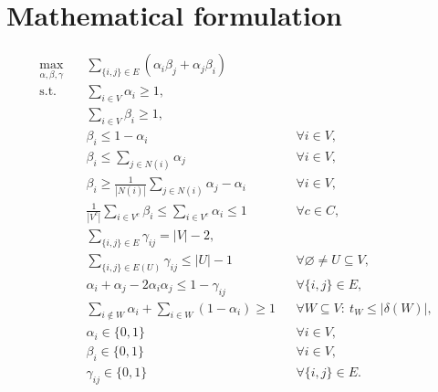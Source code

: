 \documentclass{article}
\begin{document}
\section*{Mathematical formulation}
\begin{align}
\max_{\alpha,\beta,\gamma}\quad
&\sum_{\{i,j\}\in E}\left(\alpha_i\beta_j+\alpha_j\beta_i\right) \\[-1mm]
\text{s.t.}\quad
&\sum_{i\in V}\alpha_i\ge 1, \label{eq:nonempty-alpha}\\
&\sum_{i\in V}\beta_i\ge 1, \label{eq:nonempty-beta}\\
&\beta_i\le 1-\alpha_i &&\forall i\in V, \label{eq:beta-disjoint}\\
&\beta_i\le \sum_{j\in N(i)}\alpha_j &&\forall i\in V, \label{eq:beta-adjacent}\\
&\beta_i\ge \frac{1}{|N(i)|}\sum_{j\in N(i)}\alpha_j-\alpha_i &&\forall i\in V, \label{eq:beta-forced}\\
&\frac{1}{|V^c|}\sum_{i\in V^c}\beta_i
  \le \sum_{i\in V^c}\alpha_i\le 1 &&\forall c\in C, \label{eq:color}\\
&\sum_{\{i,j\}\in E}\gamma_{ij}=|V|-2, \label{eq:tree-count}\\
&\sum_{\{i,j\}\in E(U)}\gamma_{ij}\le |U|-1 &&\forall \varnothing\ne U\subseteq V, \label{eq:acyclicity}\\
&\alpha_i+\alpha_j-2\alpha_i\alpha_j\le 1-\gamma_{ij}
 &&\forall\{i,j\}\in E, \label{eq:same-component}\\
&\sum_{i\notin W}\alpha_i+\sum_{i\in W}(1-\alpha_i)\ge 1
 &&\forall W\subseteq V:\ t_W\le |\delta(W)|, \label{eq:nogood}\\
&\alpha_i\in\{0,1\} &&\forall i\in V, \label{eq:alpha-domain}\\
&\beta_i\in\{0,1\} &&\forall i\in V, \label{eq:beta-domain}\\
&\gamma_{ij}\in\{0,1\} &&\forall\{i,j\}\in E. \label{eq:gamma-domain}
\end{align}
\end{document}
